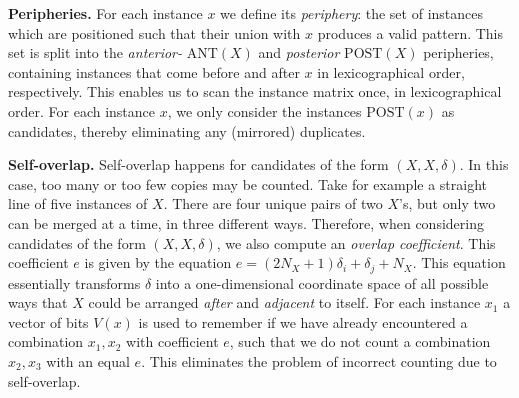 \documentclass{llncs}
\begin{document}
\smallskip \noindent \textbf{Peripheries.} For each instance $x$ we define its \emph{periphery}: the set of instances which are positioned such that their union with $x$ produces a valid pattern. This set is split into the \emph{anterior-} $\mathrm{ANT}(X)$ and \emph{posterior} $\mathrm{POST}(X)$ peripheries, containing instances that come before and after $x$ in lexicographical order, respectively. This enables us to scan the instance matrix once, in lexicographical order. For each instance $x$, we only consider the instances $\mathrm{POST}(x)$ as candidates, thereby eliminating any (mirrored) duplicates. 

\smallskip \noindent \textbf{Self-overlap.} Self-overlap happens for candidates of the form $(X,X,\delta)$. In this case, too many or too few copies may be counted. Take for example a straight line of five instances of $X$. There are four unique pairs of two $X$'s, but only two can be merged at a time, in three different ways. Therefore, when considering candidates of the form $(X,X,\delta)$, we also compute an \emph{overlap coefficient}. This coefficient $e$ is given by the equation $e = (2N_X+1)\delta_i + \delta_j + N_X$. This equation essentially transforms $\delta$ into a one-dimensional coordinate space of all possible ways that $X$ could be arranged \emph{after} and \emph{adjacent} to itself. For each instance $x_1$ a vector of bits $V(x)$ is used to remember if we have already encountered a combination $x_1,x_2$ with coefficient $e$, such that we do not count a combination $x_2,x_3$ with an equal $e$. This eliminates the problem of incorrect counting due to self-overlap.
\end{document}
